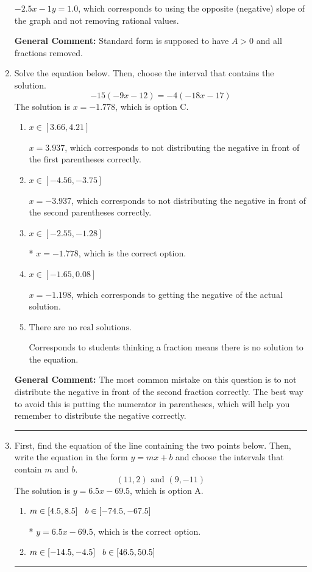 \documentclass{extbook}[14pt]
\newcommand{\litem}[1]{\item #1

\rule{\textwidth}{0.4pt}}
\begin{document}
\begin{enumerate}
{\begin{enumerate}[label=\Alph*.]
 $-2.5x - 1y = 1.0$, which corresponds to using the opposite (negative) slope of the graph and not removing rational values.
\end{enumerate}

\textbf{General Comment:} Standard form is supposed to have $A > 0$ and all fractions removed.
}
\litem{
Solve the equation below. Then, choose the interval that contains the solution.
\[ -15(-9x -12) = -4(-18x -17) \]The solution is \( x = -1.778 \), which is option C.\begin{enumerate}[label=\Alph*.]
\item \( x \in [3.66, 4.21] \)

$x = 3.937$, which corresponds to not distributing the negative in front of the first parentheses correctly.
\item \( x \in [-4.56, -3.75] \)

$x = -3.937$, which corresponds to not distributing the negative in front of the second parentheses correctly.
\item \( x \in [-2.55, -1.28] \)

* $x = -1.778$, which is the correct option.
\item \( x \in [-1.65, 0.08] \)

$x = -1.198$, which corresponds to getting the negative of the actual solution.
\item \( \text{There are no real solutions.} \)

Corresponds to students thinking a fraction means there is no solution to the equation.
\end{enumerate}

\textbf{General Comment:} The most common mistake on this question is to not distribute the negative in front of the second fraction correctly. The best way to avoid this is putting the numerator in parentheses, which will help you remember to distribute the negative correctly.
}
\litem{
First, find the equation of the line containing the two points below. Then, write the equation in the form $ y=mx+b $ and choose the intervals that contain $m$ and $b$.
\[ (11, 2) \text{ and } (9, -11) \]The solution is \( y = 6.5x -69.5 \), which is option A.\begin{enumerate}[label=\Alph*.]
\item \( m \in [4.5, 8.5] \hspace*{3mm} b \in [-74.5, -67.5] \)

* $y = 6.5x -69.5$, which is the correct option.
\item \( m \in [-14.5, -4.5] \hspace*{3mm} b \in [46.5, 50.5] \)


\end{enumerate}}
\end{enumerate}
\end{document}

